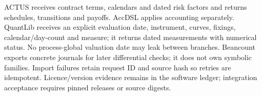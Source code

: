 ACTUS receives contract terms, calendars and dated risk factors and returns
schedules, transitions and payoffs. AccDSL applies accounting separately.
QuantLib receives an explicit evaluation date, instrument, curves, fixings,
calendar/day-count and measure; it returns dated measurements with numerical
status. No process-global valuation date may leak between branches.
Beancount exports concrete journals for later differential checks; it does
not own symbolic families. Import failures retain request ID and source hash
so retries are idempotent. Licence/version evidence remains in the software
ledger; integration acceptance requires pinned releases or source digests.


